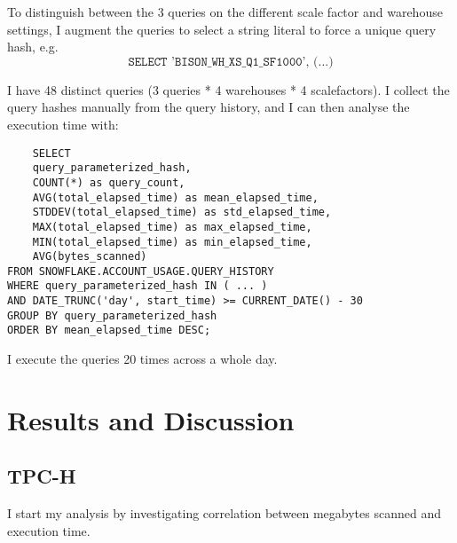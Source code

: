 \documentclass{article}
\begin{document}
\medskip \noindent To distinguish between the 3 queries on the different scale factor and warehouse settings, I augment the queries to select a string literal to force a unique query hash, e.g. $$ \texttt{SELECT 'BISON\_WH\_XS\_Q1\_SF1000', (...)} $$

\medskip \noindent I have 48 distinct queries (3 queries * 4 warehouses * 4 scalefactors). I collect the query hashes manually from the query history, and I can then analyse the execution time with: 

\begin{verbatim}
    SELECT 
    query_parameterized_hash,
    COUNT(*) as query_count,
    AVG(total_elapsed_time) as mean_elapsed_time,
    STDDEV(total_elapsed_time) as std_elapsed_time,
    MAX(total_elapsed_time) as max_elapsed_time,
    MIN(total_elapsed_time) as min_elapsed_time,
    AVG(bytes_scanned)
FROM SNOWFLAKE.ACCOUNT_USAGE.QUERY_HISTORY
WHERE query_parameterized_hash IN ( ... )
AND DATE_TRUNC('day', start_time) >= CURRENT_DATE() - 30
GROUP BY query_parameterized_hash
ORDER BY mean_elapsed_time DESC;
\end{verbatim}

\noindent I execute the queries 20 times across a whole day. 


\section{Results and Discussion}

\FloatBarrier

\subsection{TPC-H}

I start my analysis by investigating correlation between megabytes scanned and execution time.
\end{document}
